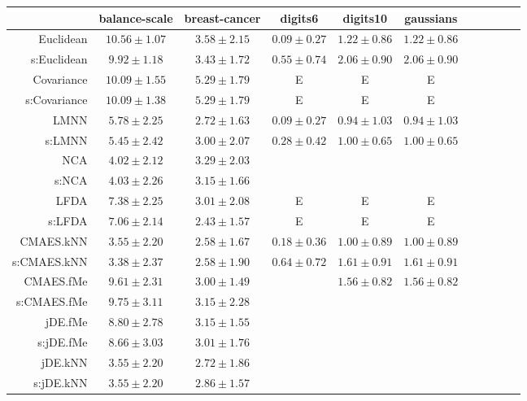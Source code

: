 \begin{table}[ht] \centering
{\small\renewcommand{\arraystretch}{1.0}
\setlength{\tabcolsep}{2pt}
\begin{tabular}{rcccccccccc}
\toprule


& \multicolumn{1}{c}{balance-scale} & \multicolumn{1}{c}{breast-cancer} & \multicolumn{1}{c}{digits6} & \multicolumn{1}{c}{digits10} & \multicolumn{1}{c}{gaussians} \\ 
\midrule
Euclidean & $10.56\pm1.07$ & $3.58\pm2.15$ & $\bm{0.09\pm0.27}$ & $1.22\pm0.86$ & $1.22\pm0.86$ \\
s:Euclidean & $9.92\pm1.18$ & $3.43\pm1.72$ & $0.55\pm0.74$ & $2.06\pm0.90$ & $2.06\pm0.90$ \\
Covariance & $10.09\pm1.55$ & $5.29\pm1.79$ & E  & E  & E  \\
s:Covariance & $10.09\pm1.38$ & $5.29\pm1.79$ & E  & E  & E  \\
LMNN & $5.78\pm2.25$ & $2.72\pm1.63$ & $\bm{0.09\pm0.27}$ & $\bm{0.94\pm1.03}$ & $\bm{0.94\pm1.03}$ \\
s:LMNN & $5.45\pm2.42$ & $3.00\pm2.07$ & $0.28\pm0.42$ & $1.00\pm0.65$ & $1.00\pm0.65$ \\
NCA & $4.02\pm2.12$ & $3.29\pm2.03$ &  &  &  \\
s:NCA & $4.03\pm2.26$ & $3.15\pm1.66$ &  &  &  \\
LFDA & $7.38\pm2.25$ & $3.01\pm2.08$ & E  & E  & E  \\
s:LFDA & $7.06\pm2.14$ & $\bm{2.43\pm1.57}$ & E  & E  & E  \\
CMAES.kNN & $3.55\pm2.20$ & $2.58\pm1.67$ & $0.18\pm0.36$ & $1.00\pm0.89$ & $1.00\pm0.89$ \\
s:CMAES.kNN & $\bm{3.38\pm2.37}$ & $2.58\pm1.90$ & $0.64\pm0.72$ & $1.61\pm0.91$ & $1.61\pm0.91$ \\
CMAES.fMe & $9.61\pm2.31$ & $3.00\pm1.49$ &  & $1.56\pm0.82$ & $1.56\pm0.82$ \\
s:CMAES.fMe & $9.75\pm3.11$ & $3.15\pm2.28$ &  &  &  \\
jDE.fMe & $8.80\pm2.78$ & $3.15\pm1.55$ &  &  &  \\
s:jDE.fMe & $8.66\pm3.03$ & $3.01\pm1.76$ &  &  &  \\
jDE.kNN & $3.55\pm2.20$ & $2.72\pm1.86$ &  &  &  \\
s:jDE.kNN & $3.55\pm2.20$ & $2.86\pm1.57$ &  &  &  \\

\end{tabular}}
\end{table}
